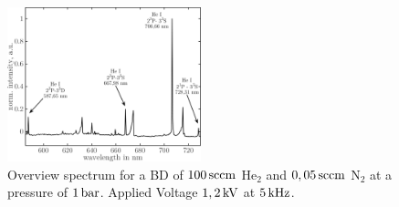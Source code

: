 \documentclass[a4paper,10pt,twoside]{article}
\begin{document}
				\begin{figure}[t]
					\centering
					\hspace{-0.5cm}\includegraphics[width=0.5\textwidth]{figures/results/int_spectrum}
					\caption{Overview spectrum for a BD of $\unit[100]{sccm}$ He$_2$ and $\unit[0,05]{sccm}$ N$_2$ at a pressure of $\unit[1]{bar}$. Applied Voltage $\unit[1,2]{kV}$ at $\unit[5]{kHz}$.}
					\label{img:intspec}
				\end{figure}
			
\end{document}
